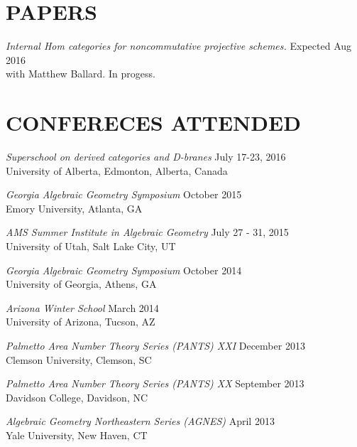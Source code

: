 \documentclass[line,overlapped]{res}
\begin{document}
\begin{resume}
                  \section{PAPERS}
                          {\sl  Internal Hom categories for noncommutative projective schemes.} \hfill Expected Aug 2016\\
		          with Matthew Ballard.  In progess.
                          \newpage
                          \section{CONFERECES ATTENDED}
		                  {\sl Superschool on derived categories and D-branes} \hfill July 17-23, 2016\\
		                  University of Alberta, Edmonton, Alberta, Canada

                                  {\sl Georgia Algebraic Geometry Symposium} \hfill October 2015\\
                                  Emory University, Atlanta, GA

                                  {\sl AMS Summer Institute in Algebraic Geometry} \hfill July 27 - 31, 2015\\
                                  University of Utah, Salt Lake City, UT

                                  {\sl Georgia Algebraic Geometry Symposium} \hfill October 2014\\
                                  University of Georgia, Athens, GA

                                  {\sl Arizona Winter School} \hfill March 2014\\
                                  University of Arizona, Tucson, AZ

                                  {\sl Palmetto Area Number Theory Series (PANTS) XXI} \hfill December 2013\\
                                  Clemson University, Clemson, SC

                                  {\sl Palmetto Area Number Theory Series (PANTS) XX} \hfill September 2013\\
                                  Davidson College, Davidson, NC

                                  {\sl Algebraic Geometry Northeastern Series (AGNES)} \hfill April 2013\\
                                  Yale University, New Haven, CT


\end{resume}
\end{document}
